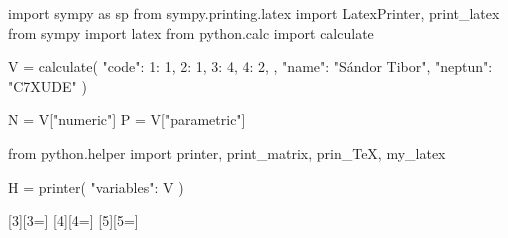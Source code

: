 \usepackage{pyluatex}

\begin{python}
import sympy as sp
from sympy.printing.latex import LatexPrinter, print_latex
from sympy import latex
from python.calc import calculate

V = calculate({
    "code": {
        1: 1, 
        2: 1,
        3: 4,
        4: 2,
    },
    "name": "Sándor Tibor",
    "neptun": "C7XUDE"
})

N = V["numeric"]
P = V["parametric"]

from python.helper import printer, print_matrix, prin_TeX, my_latex

H = printer({
    "variables": V
})
\end{python}

\usepackage{xargs}

\newcommand{\pv}[1]{\py{V["#1"]}}
\newcommand{\pvec}[2]{\py{V["#1"][#2]}}
\newcommand{\pmat}[3]{\py{V["#1"][#2, #3]}}

[3][3=]{}
[4][4=]{}
[5][5=]{}
